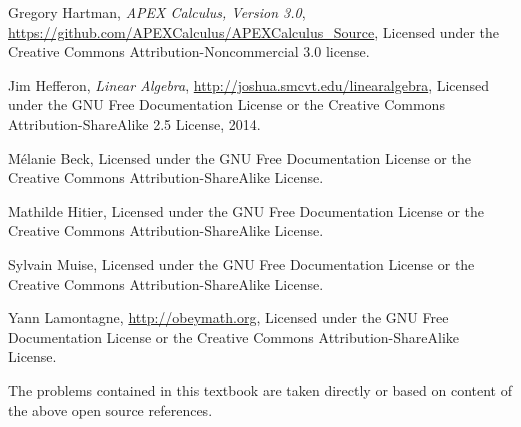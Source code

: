 

\begin{thebibliography}{9}
\label{label:authors}
Gregory Hartman,
\emph{APEX Calculus, Version 3.0},
\url{https://github.com/APEXCalculus/APEXCalculus_Source},
Licensed under the
Creative Commons Attribution-Noncommercial 3.0 license.


 

Jim Hefferon,
\emph{Linear Algebra},
\url{http://joshua.smcvt.edu/linearalgebra},
Licensed under the GNU Free Documentation License or the 
Creative Commons Attribution-ShareAlike 2.5 License,
2014.


M\'elanie Beck,
Licensed under the GNU Free Documentation License or the
Creative Commons Attribution-ShareAlike License.



Mathilde Hitier,
Licensed under the GNU Free Documentation License or the
Creative Commons Attribution-ShareAlike License.



Sylvain Muise,
Licensed under the GNU Free Documentation License or the
Creative Commons Attribution-ShareAlike License.



Yann Lamontagne,
\url{http://obeymath.org},
Licensed under the GNU Free Documentation License or the 
Creative Commons Attribution-ShareAlike License.

\end{thebibliography}
The problems contained in this textbook are taken directly or based on content of the above open source references.
\\

